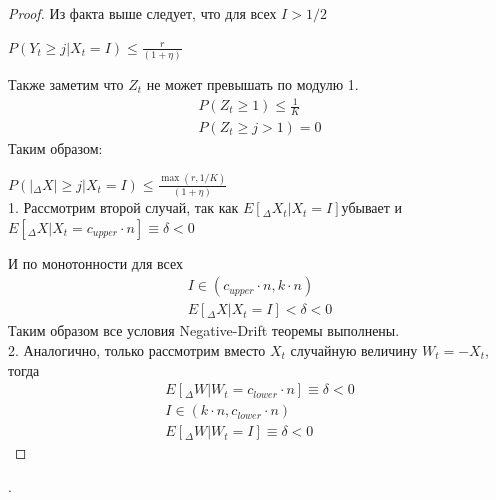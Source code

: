 \documentclass[times]{itmo-student-thesis}
\newcommand{\Edelta}{$E[_{\Delta} X_t| X_t=I]$}
\begin{document}
    \begin{proof}
        Из факта выше следует, что для всех $I > 1/2$

        $P(Y_t \geq j|X_t = I) \leq \frac{r}{(1 + \eta)}$

        Также заметим что $Z_t$ не может превышать по модулю 1.
        \begin{gather*}
            P(Z_t \geq 1) \leq \frac{1}{K} \\
            P(Z_t \geq j > 1)= 0
        \end{gather*}
        Таким образом:

        $P(|_{\Delta} X| \geq j|X_t = I) \leq \frac{\max(r, 1/K)}{(1 + \eta)}$ \\

        1. Рассмотрим второй случай, так как \Edelta  убывает и $E[_{\Delta} X| X_t = c_{upper} \cdot n] \equiv \delta < 0$

        И по монотонности для всех
        \begin{gather*}
            I \in (c_{upper} \cdot n, k \cdot n) \\
            E[_{\Delta} X| X_t = I] < \delta < 0
        \end{gather*}
        Таким образом все условия Negative-Drift теоремы выполнены. \\

        2. Аналогично, только рассмотрим вместо $X_t$ случайную величину $W_t = -X_t$, тогда
        \begin{gather*}
            E[_{\Delta} W| W_t = c_{lower} \cdot n] \equiv \delta < 0 \\
            I \in (k \cdot n, c_{lower} \cdot n)  \\
            E[_{\Delta} W| W_t = I] \equiv \delta < 0
        \end{gather*}
    \end{proof}.
\end{document}
